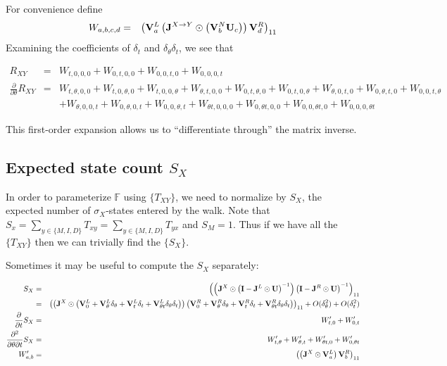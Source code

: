 \documentclass{article}
\begin{document}
For convenience define
\begin{eqnarray*}
W_{a,b,c,d} & = &
\left( {\bf V}^L_a \left( {\bf J}^{X \to Y} \odot \left( {\bf V}^N_b {\bf U}_c \right) \right) {\bf V}^R_d \right)_{11}
\end{eqnarray*}
Examining the coefficients of $\delta_t$ and $\delta_\theta \delta_t$, we see that

\begin{eqnarray*}
  R_{XY} & = &
  W_{t,0,0,0} + W_{0,t,0,0} + W_{0,0,t,0} + W_{0,0,0,t}
  \\
  \frac{\partial}{\partial \theta}R_{XY} & = &
  W_{t,\theta,0,0} + W_{t,0,\theta,0} + W_{t,0,0,\theta}
  + W_{\theta,t,0,0} + W_{0,t,\theta,0} + W_{0,t,0,\theta}
  + W_{\theta,0,t,0} + W_{0,\theta,t,0} + W_{0,0,t,\theta}
  \\ & &
  + W_{\theta,0,0,t} + W_{0,\theta,0,t} + W_{0,0,\theta,t}
  + W_{\theta t,0,0,0} + W_{0,\theta t,0,0} + W_{0,0,\theta t,0} + W_{0,0,0,\theta t}
\end{eqnarray*}

This first-order expansion allows us to ``differentiate through'' the matrix inverse.

\subsection{Expected state count $S_X$}

In order to parameterize $\mathbb{F}$ using $\{ T_{XY} \}$, we need to normalize by $S_X$, the expected number of $\sigma_X$-states entered by the walk.
Note that $S_x = \sum_{y \in \{M,I,D\}} T_{xy}  = \sum_{y \in \{M,I,D\}} T_{yx}$
and $S_M = 1$.
Thus if we have all the $\{ T_{XY} \}$ then we can trivially find the $\{ S_X \}$.

Sometimes it may be useful to compute the $S_X$ separately:

\begin{eqnarray*}
S_X & = &
\left(
     \left(
          {\bf J}^X \odot
          \left( {\bf I} - {\bf J}^L \odot {\bf U} \right)^{-1}
     \right)
\left( {\bf I} - {\bf J}^R \odot {\bf U} \right)^{-1}
\right)_{11}
\\
& = &
\left(
     \left(
          {\bf J}^X \odot
          \left( {\bf V}_0^{L} + {\bf V}_\theta^{L} \delta_\theta + {\bf V}_t^{L} \delta_t + {\bf V}_{\theta t}^{L} \delta_\theta \delta_t \right)
     \right)
\left( {\bf V}_0^{R} + {\bf V}_\theta^{R} \delta_\theta + {\bf V}_t^{R} \delta_t + {\bf V}_{\theta t}^{R} \delta_\theta \delta_t \right)
\right)_{11}  + O(\delta_\theta^2) + O(\delta_t^2)
  \\
\frac{\partial}{\partial t} S_X & = &
  W'_{t,0} + W'_{0,t}
  \\
\frac{\partial^2}{\partial \theta \partial t} S_X & = &
  W'_{t,\theta} + W'_{\theta,t}
  + W'_{\theta t,0} + W'_{0,\theta t}
\\
W'_{a,b} & = &
\left( \left( {\bf J}^X \odot {\bf V}^L_a \right) {\bf V}^R_b \right)_{11}
\end{eqnarray*}
\end{document}
